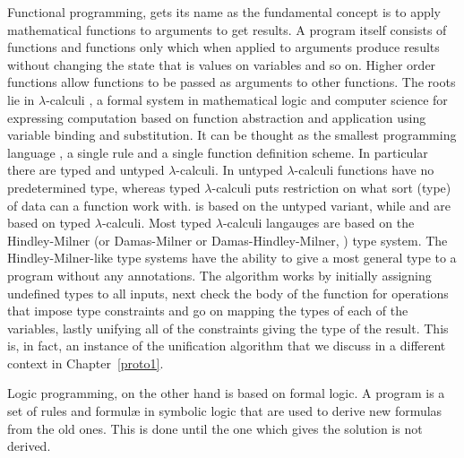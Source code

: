 \documentclass[thesis-solanki.tex]{subfiles}
\begin{document}
Functional programming, \cite{hughes1989functional} gets its name as the fundamental concept is
to apply mathematical functions to arguments to get results.
A program itself consists of functions and functions only which when applied to arguments produce results without
changing the state that is values on variables and so on.
Higher order functions allow functions to be passed as arguments to other functions.
The roots lie in $\lambda$-calculi \cite{website:lambdacalculuswiki}, a formal system in mathematical logic and
computer science for expressing computation based on function abstraction and application using variable binding
and substitution.
It can be thought as the smallest programming language \cite{rojas2004tutorial}, a single rule and a single
function definition scheme.
In particular there are typed and untyped $\lambda$-calculi.
In untyped $\lambda$-calculi functions have no predetermined type, whereas typed $\lambda$-calculi puts restriction
on what sort (type) of data can a function work with.
 is based on the untyped variant, while  and  are based on typed
$\lambda$-calculi.
Most typed $\lambda$-calculi langauges are based on the Hindley-Milner (or Damas-Milner or Damas-Hindley-Milner,
\cite{hindley1969principal,milner1978theory,website:hdmtypesystemwiki}) type system.
The Hindley-Milner-like type systems have the ability to give a most general type to a program
without any annotations.
The algorithm \cite{website:hdmtypesystem} works by initially assigning undefined types to all inputs, next check
the body of the function for operations that impose type constraints and go on mapping the types of each of the 
variables, lastly unifying all of the constraints giving the type of the result.
This is, in fact, an instance of the unification algorithm that we discuss in a different context in Chapter~\ref{proto1}.

Logic programming, \cite{spivey1995introduction} on the other hand is based on formal logic.
A program is a set of rules and formul\ae{} in symbolic logic that are used to derive new formulas from the old
ones.
This is done until the one which gives the solution is not derived.
\end{document}
